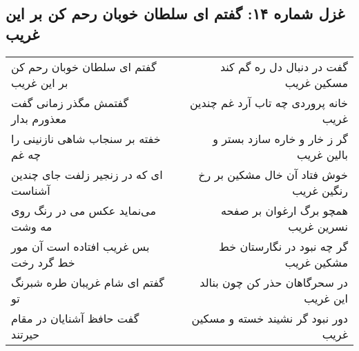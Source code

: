 \begin{center}
\section*{غزل شماره ۱۴: گفتم ای سلطان خوبان رحم کن بر این غریب}
\label{sec:sh014}
\begin{longtable}{l p{0.5cm} r}
گفتم ای سلطان خوبان رحم کن بر این غریب
&&
گفت در دنبال دل ره گم کند مسکین غریب
\\
گفتمش مگذر زمانی گفت معذورم بدار
&&
خانه پروردی چه تاب آرد غم چندین غریب
\\
خفته بر سنجاب شاهی نازنینی را چه غم
&&
گر ز خار و خاره سازد بستر و بالین غریب
\\
ای که در زنجیر زلفت جای چندین آشناست
&&
خوش فتاد آن خال مشکین بر رخ رنگین غریب
\\
می‌نماید عکس می در رنگ روی مه وشت
&&
همچو برگ ارغوان بر صفحه نسرین غریب
\\
بس غریب افتاده است آن مور خط گرد رخت
&&
گر چه نبود در نگارستان خط مشکین غریب
\\
گفتم ای شام غریبان طره شبرنگ تو
&&
در سحرگاهان حذر کن چون بنالد این غریب
\\
گفت حافظ آشنایان در مقام حیرتند
&&
دور نبود گر نشیند خسته و مسکین غریب
\\
\end{longtable}
\end{center}

